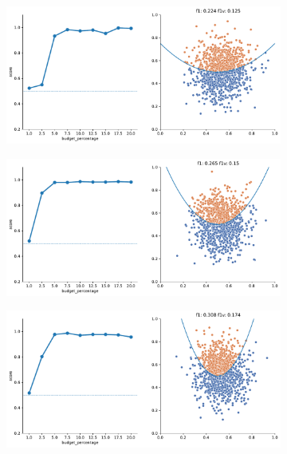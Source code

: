 \begin{appendices}
\begin{figure}
    \begin{subfigure}{.5\textwidth}
        \centering
        \includegraphics[width=\textwidth]{img/2d_v2/1.pdf}
    \end{subfigure}%
    \begin{subfigure}{.5\textwidth}
        \centering
        \includegraphics[width=\textwidth]{img/2d_v2/2.pdf}
    \end{subfigure}
    \hfill
    \begin{subfigure}{.5\textwidth}
        \centering
        \includegraphics[width=\textwidth]{img/2d_v2/3.pdf}

\end{subfigure}
\end{figure}
\end{appendices}
